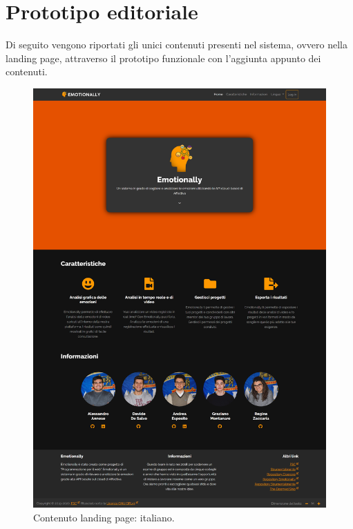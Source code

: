 
\chapter{Prototipo editoriale}\label{chap:prototipo-editoriale}

Di seguito vengono riportati gli unici contenuti presenti nel sistema, ovvero 
nella landing page, attraverso il prototipo funzionale con l'aggiunta appunto 
dei contenuti.
 
\begin{figure}[H]
	\centering
	\caption{Contenuto landing page: italiano.}
	\label{fig:contenuto-landing:italiano}
	\includegraphics[width=\textwidth-20ex]{images/prototipo-editoriale/ita}
\end{figure}

